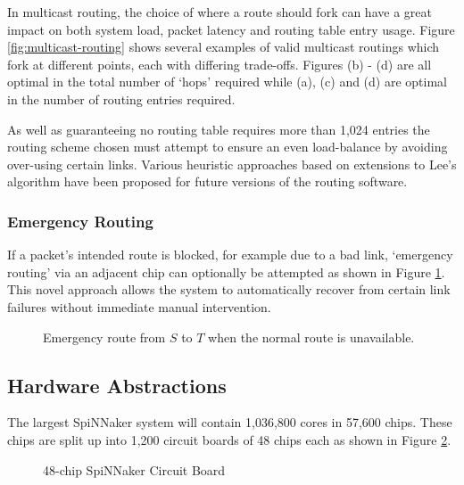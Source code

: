 				In multicast routing, the choice of where a route should fork can have a
				great impact on both system load, packet latency and routing table entry
				usage. Figure \ref{fig:multicast-routing} shows several examples of
				valid multicast routings which fork at different points, each with
				differing trade-offs. Figures (b) - (d) are all optimal in the total
				number of `hops' required while (a), (c) and (d) are optimal in the
				number of routing entries required.
				
				As well as guaranteeing no routing table requires more than 1,024
				entries the routing scheme chosen must attempt to ensure an even
				load-balance by avoiding over-using certain links. Various heuristic
				approaches based on extensions to Lee's algorithm have been proposed for
				future versions of the routing software\cite{davidson13}.
			
			\subsubsection{Emergency Routing}
				
				If a packet's intended route is blocked, for example due to a bad link,
				`emergency routing' via an adjacent chip can optionally be attempted as
				shown in Figure \ref{fig:emergency-routing}. This novel approach allows
				the system to automatically recover from certain link failures without
				immediate manual intervention.
				
				\begin{figure}
					\center
					
					\caption{Emergency route from $S$ to $T$ when the normal route is
					unavailable.}
					\label{fig:emergency-routing}
				\end{figure}
			
		
		\subsection{Hardware Abstractions}
			
			
			The largest SpiNNaker system will contain 1,036,800 cores in 57,600 chips.
			These chips are split up into 1,200 circuit boards of 48 chips each as
			shown in Figure \ref{fig:spinn4labelled}.
			
			\begin{figure}
				\center
				
				\caption{48-chip SpiNNaker Circuit Board}
				\label{fig:spinn4labelled}
			\end{figure}
			
